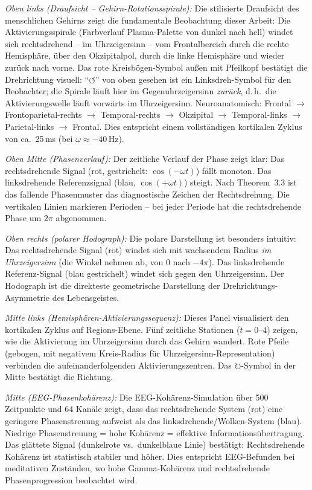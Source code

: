 ﻿\documentclass[12pt,a4paper]{report}
\theoremstyle{plain}
\theoremstyle{definition}
\theoremstyle{remark}
\begin{document}
\textit{Oben links (Draufsicht -- Gehirn-Rotationsspirale):}
	Die stilisierte Draufsicht des menschlichen Gehirns zeigt die fundamentale
	Beobachtung dieser Arbeit: Die Aktivierungsspirale (Farbverlauf Plasma-Palette
	von dunkel nach hell) windet sich rechtsdrehend -- im Uhrzeigersinn --
	vom Frontalbereich durch die rechte Hemisphäre, über den Okzipitalpol,
	durch die linke Hemisphäre und wieder zurück nach vorne.
	Das rote Kreisbögen-Symbol au\ss{}en mit Pfeilkopf bestätigt die Drehrichtung
	visuell: ``$\circlearrowleft$'' von oben gesehen ist ein Linksdreh-Symbol
	für den Beobachter; die Spirale läuft hier im Gegenuhrzeigersinn
	\emph{zur\"{u}ck}, d.\,h.\ die Aktivierungswelle läuft vorwärts im Uhrzeigersinn.
	Neuroanatomisch: Frontal $\to$ Frontoparietal-rechts $\to$ Temporal-rechts
	$\to$ Okzipital $\to$ Temporal-links $\to$ Parietal-links $\to$ Frontal.
	Dies entspricht einem vollständigen kortikalen Zyklus von ca.\ 25\,ms
	(bei $\omega \approx -40$\,Hz).

	\textit{Oben Mitte (Phasenverlauf):}
	Der zeitliche Verlauf der Phase zeigt klar: Das rechtsdrehende Signal
	(rot, gestrichelt: $\cos(-\omega t)$) fällt monoton. Das linksdrehende
	Referenzsignal (blau, $\cos(+\omega t)$) steigt. Nach Theorem~3.3
	ist das fallende Phasenmuster das diagnostische Zeichen der Rechtsdrehung.
	Die vertikalen Linien markieren Perioden -- bei jeder Periode hat die
	rechtsdrehende Phase um $2\pi$ abgenommen.

	\textit{Oben rechts (polarer Hodograph):}
	Die polare Darstellung ist besonders intuitiv: Das rechtsdrehende Signal
	(rot) windet sich mit wachsendem Radius \emph{im Uhrzeigersinn}
	(die Winkel nehmen ab, von $0$ nach $-4\pi$). Das linksdrehende
	Referenz-Signal (blau gestrichelt) windet sich gegen den Uhrzeigersinn.
	Der Hodograph ist die direkteste geometrische Darstellung der
	Drehrichtungs-Asymmetrie des Lebensgeistes.

	\textit{Mitte links (Hemisphären-Aktivierungssequenz):}
	Dieses Panel visualisiert den kortikalen Zyklus auf Regions-Ebene.
	Fünf zeitliche Stationen ($t = 0$--$4$) zeigen, wie die Aktivierung
	im Uhrzeigersinn durch das Gehirn wandert. Rote Pfeile (gebogen, mit
	negativem Kreis-Radius für Uhrzeigersinn-Representation) verbinden die
	aufeinanderfolgenden Aktivierungszentren. Das $\circlearrowright$-Symbol
	in der Mitte bestätigt die Richtung.

	\textit{Mitte (EEG-Phasenkohärenz):}
	Die EEG-Kohärenz-Simulation über 500 Zeitpunkte und 64 Kanäle
	zeigt, dass das rechtsdrehende System (rot) eine geringere Phasenstreuung
	aufweist als das linksdrehende/Wolken-System (blau).
	Niedrige Phasenstreuung = hohe Kohärenz = effektive Informationsübertragung.
	Das glättete Signal (dunkelrote vs.\ dunkelblaue Linie) bestätigt:
	Rechtsdrehende Kohärenz ist statistisch stabiler und höher.
	Dies entspricht EEG-Befunden bei meditativen Zuständen, wo hohe
	Gamma-Kohärenz und rechtsdrehende Phasenprogression beobachtet wird.
\end{document}
